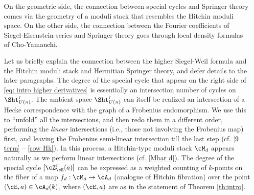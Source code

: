 On the geometric side, the connection between special cycles and Springer theory comes via the geometry of a moduli stack that resembles the Hitchin moduli space. On the other side, the connection between the Fourier coefficients of Siegel-Eisenstein series and Springer theory goes through local density formulas of Cho-Yamauchi.

Let us briefly explain the connection between the higher Siegel-Weil formula and the Hitchin moduli stack and Hermitian Springer theory, and defer details to the later paragraphs.  The degree of the special cycle that appear on the right side of \eqref{eq: intro higher derivatives} is essentially an intersection number of cycles on $\Sht^{r}_{U(n)}$. The ambient space $\Sht^{r}_{U(n)}$ can itself be realized an intersection of a Hecke correspondence with the graph of a Frobenius endomorphism. We use this to ``unfold'' all the intersections, and then redo them in a different order, performing the \emph{linear} intersections (i.e., those not involving the Frobenius map) first, and leaving the Frobenius semi-linear intersection till the last step (cf. \eqref{9 term} --  \eqref{row Hk}). In this process, a Hitchin-type moduli stack $\cM_{d}$ appears naturally as we perform linear intersections (cf. \eqref{Mbar d}). The degree of the special cycle $[\cZ^{r}_{\cE}(a)]$ can be expressed as a weighted counting of $k$-points on the fiber of a map $f_{d}: \cM_{d}\to \cA_{d}$ (analogue of Hitchin fibration) over the point $(\cE,a)\in \cA_d(k)$, where $(\cE,a)$ are as in the statement of Theorem \ref{th:intro}.


